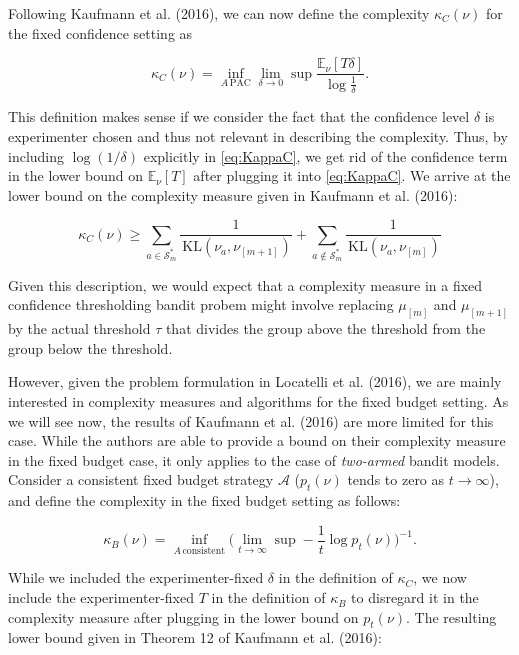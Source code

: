 \documentclass[11pt,]{article}
\newcommand{\KL}{\,\text{KL}}
\begin{document}
Following Kaufmann et al. (2016), we can now define the complexity
\(\kappa_C(\nu)\) for the fixed confidence setting as

\begin{equation}
\kappa_C(\nu) = \inf_{A \, \text{PAC}} \lim_{\delta \to 0} \sup \frac{\mathbb{E}_{\nu}[T{\delta}]}{\log \frac{1}{\delta}}. \label{eq:KappaC}
\end{equation}

This definition makes sense if we consider the fact that the confidence
level \(\delta\) is experimenter chosen and thus not relevant in
describing the complexity. Thus, by including \(\log(1/\delta)\)
explicitly in \eqref{eq:KappaC}, we get rid of the confidence term in
the lower bound on \(\mathbb{E}_{\nu}[T]\) after plugging it into
\eqref{eq:KappaC}. We arrive at the lower bound on the complexity
measure given in Kaufmann et al. (2016):

\begin{equation*}
\kappa_C(\nu) \geq \sum_{a \in \mathcal{S}_m^*} \frac{1}{\KL(\nu_a, \nu_{[m+1]})} + \sum_{a \notin \mathcal{S}_m^*} \frac{1}{\KL(\nu_a, \nu_{[m]})}
\end{equation*}

Given this description, we would expect that a complexity measure in a
fixed confidence thresholding bandit probem might involve replacing
\(\mu_{[m]}\) and \(\mu_{[m+1]}\) by the actual threshold \(\tau\) that
divides the group above the threshold from the group below the
threshold.

However, given the problem formulation in Locatelli et al. (2016), we
are mainly interested in complexity measures and algorithms for the
fixed budget setting. As we will see now, the results of Kaufmann et al.
(2016) are more limited for this case. While the authors are able to
provide a bound on their complexity measure in the fixed budget case, it
only applies to the case of \emph{two-armed} bandit models. Consider a
consistent fixed budget strategy \(\mathcal{A}\) (\(p_t(\nu)\) tends to
zero as \(t \rightarrow \infty\)), and define the complexity in the
fixed budget setting as follows:

\begin{equation}
\kappa_B(\nu) = \inf_{A \, \text{consistent}} \big(\lim_{t \to \infty} \sup - \frac{1}{t} \log p_t(\nu)\big)^{-1}.
\end{equation}

While we included the experimenter-fixed \(\delta\) in the definition of
\(\kappa_C\), we now include the experimenter-fixed \(T\) in the
definition of \(\kappa_B\) to disregard it in the complexity measure
after plugging in the lower bound on \(p_t(\nu)\). The resulting lower
bound given in Theorem 12 of Kaufmann et al. (2016):
\end{document}
